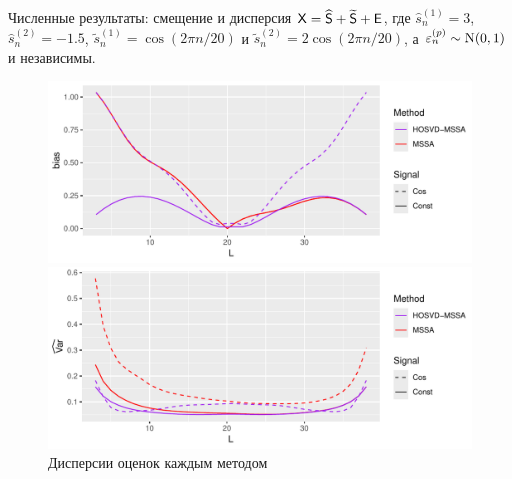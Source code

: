 \documentclass[pdf, unicode, 9pt, notheorems, handout]{beamer}
\begin{document}
\begin{frame}{Численные результаты: смещение и дисперсия}
  $\mathsf{X} = \widehat{\mathsf{S}} + \widetilde{\mathsf{S}} + \mathsf{E}$,
  где $\hat{s}_n^{(1)} = 3$, $\hat{s}_n^{(2)} = -1.5$,
  $\tilde{s}_n^{(1)} = \cos(2\pi n / 20)$ и $\tilde{s}_n^{(2)} =
  2\cos(2\pi n / 20)$,
  а $\varepsilon_n^{(p)}\sim \mathrm{N}(0, 1)$ и независимы.
  \begin{figure}
    \begin{minipage}[c]{0.8\textwidth}
      \hspace{-0.4cm}
      \includegraphics[width=\linewidth]{../img/approx_sep_no_noise_slides}
    \end{minipage}\hfill
    \begin{minipage}[c]{0.2\textwidth}
      \caption{Смещение оценок каждым методом (RMSE без шума)}
    \end{minipage}
    \begin{minipage}[c]{0.8\textwidth}
      \vspace{-0.1cm}
      \hspace{-0.4cm}
      \includegraphics[width=\linewidth]{../img/approx_sep_large_noise_var}
    \end{minipage}\hfill
    \begin{minipage}[c]{0.2\textwidth}
      \caption{Дисперсии оценок каждым методом}
    \end{minipage}
  \end{figure}
\end{frame}
\end{document}
